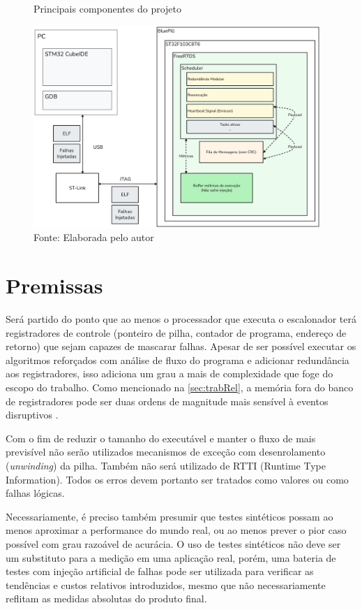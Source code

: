 \begin{figure}[H]
    \centering
    \captionsetup{justification=centering}
    \caption{Principais componentes do projeto}
    \includegraphics[width=0.97\textwidth]{assets/visao_geral.png}
    \captionsetup{justification=raggedright}
    \caption*{Fonte: Elaborada pelo autor}
    \label{fig:visaoGeral}
\end{figure}

\section{Premissas}

Será partido do ponto que ao menos o processador que executa o escalonador terá registradores de controle (ponteiro de pilha, contador de programa, endereço de retorno) que sejam capazes de mascarar falhas. Apesar de ser possível executar os algoritmos reforçados com análise de fluxo do programa e adicionar redundância aos registradores, isso adiciona um grau a mais de complexidade que foge do escopo do trabalho. Como mencionado na \autoref{sec:trabRel}, a memória fora do banco de registradores pode ser duas ordens de magnitude mais sensível à eventos disruptivos \cite{ReliabilityArmCortexUnderHeavyIons}.

Com o fim de reduzir o tamanho do executável e manter o fluxo de mais previsível não serão utilizados mecanismos de exceção com desenrolamento (\textit{unwinding}) da pilha. Também não será utilizado de RTTI (Runtime Type Information). Todos os erros devem portanto ser tratados como valores ou como falhas lógicas.

Necessariamente, é preciso também presumir que testes sintéticos possam ao menos aproximar a performance do mundo real, ou ao menos prever o pior caso possível com grau razoável de acurácia. O uso de testes sintéticos não deve ser um substituto para a medição em uma aplicação real, porém, uma bateria de testes com injeção artificial de falhas pode ser utilizada para verificar as tendências e custos relativos introduzidos, mesmo que não necessariamente reflitam as medidas absolutas do produto final.

